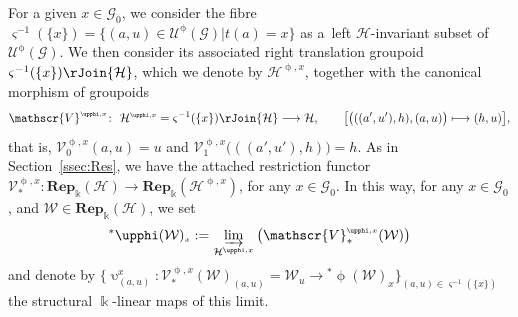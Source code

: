 \documentclass[10pt,a4paper]{amsart}
\numberwithin{equation}{section}
\newcommand{\Rep}[1]{\mathbf{Rep}_{\Sscript{\Bbbk}}(#1)}
\newcommand{\Go}{\cG_{\Sscript{0}}}
\newcommand{\uU}{\mathscr{U}}
\newcommand{\vV}{\mathscr{V}}
\newcommand{\cG}{{\mathcal G}}
\newcommand{\cH}{{\mathcal H}}
\newcommand{\cW}{{\mathcal W}}
\newcommand{\Sscript}[1]{\scriptscriptstyle{#1}}
\newcommand{\injlimit}[2]{\varinjlim_{#1}\left({#2}\right)}
\newcommand{\upg}{\uU^{\Sscript{\upphi}}(\cG)}
\begin{document}
For a given $x \in\Go$, we consider the fibre $\varsigma^{-1}(\{x\})=\big\{ (a,u) \in \upg| t(a)=x \big\}$ as a~left $\cH$-invariant subset of $\upg$. We then consider its associated right translation groupoid $\varsigma^{-1}(\{x\}) \rJoin \cH$, which we denote by $\cH^{\Sscript{\upphi, x}}$, together with the canonical morphism of groupoids
\begin{gather*}
\vV^{\Sscript{\upphi, x}}\colon \ \cH^{\Sscript{\upphi, x}}= \varsigma^{-1}(\{x\}) \rJoin \cH \longrightarrow \cH, \qquad \big[ \big( ((a',u'),h), (a,u)\big) \longmapsto (h,u) \big],
\end{gather*}
that is, $\vV^{\Sscript{\upphi, x}}_{\Sscript{0}}(a,u)=u$ and $\vV^{\Sscript{\upphi, x}}_{\Sscript{1}}\big( ((a',u'),h) \big)=h$. As in Section~\ref{ssec:Res}, we have the attached restriction
functor $\vV^{\Sscript{\upphi, x}}_*\colon \Rep{\cH} \to \Rep{\cH^{\Sscript\upphi, x}}$, for any $x \in \Go$.
In this way, for any $x \in \Go$, and $\cW \in \Rep{\cH}$, we set\begin{gather}\label{Eq:SPx} {}^*\upphi(\cW)_{\Sscript{x}}: = \injlimit{\cH^{\Sscript{\upphi,
x}}}{\vV^{\Sscript{\upphi, x}}_*(\cW)}
\end{gather}
and denote by $\big\{\upupsilon^{\Sscript{x}}_{\Sscript{(a, u)}}\colon \vV^{\Sscript{\upphi, x}}_*(\cW)_{\Sscript{(a, u)}}=\cW_{\Sscript{u}} \longrightarrow {}^*\upphi(\cW)_{\Sscript{x}} \big\}_{\Sscript{(a, u) \in \varsigma^{-1}(\{x\})}}$ the structural $\Bbbk$-linear maps of this limit.
\end{document}

